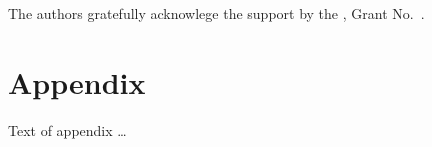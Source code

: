 \documentclass[sigplan,10pt,review, anonymous]{acmart}
\theoremstyle{definition}
\begin{document}
\begin{acks}                            %
  The authors gratefully acknowlege the support by the
  , Grant
  No.~.
\end{acks}



\appendix
\section{Appendix}

Text of appendix \ldots
\end{document}
